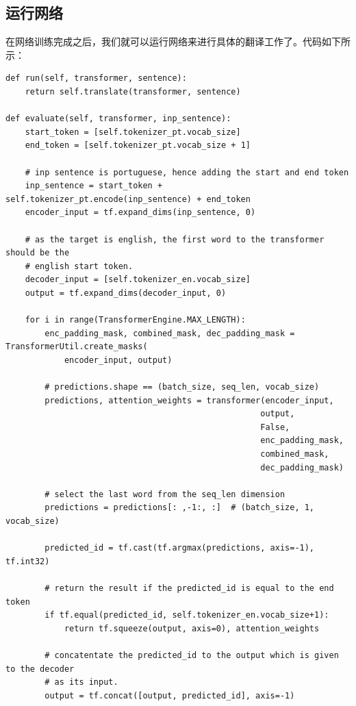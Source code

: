 \documentclass{article}
\begin{document}
\subsection{运行网络}
在网络训练完成之后，我们就可以运行网络来进行具体的翻译工作了。代码如下所示：
\begin{lstlisting}
def run(self, transformer, sentence):
    return self.translate(transformer, sentence)

def evaluate(self, transformer, inp_sentence):
    start_token = [self.tokenizer_pt.vocab_size]
    end_token = [self.tokenizer_pt.vocab_size + 1]
    
    # inp sentence is portuguese, hence adding the start and end token
    inp_sentence = start_token + self.tokenizer_pt.encode(inp_sentence) + end_token
    encoder_input = tf.expand_dims(inp_sentence, 0)
    
    # as the target is english, the first word to the transformer should be the
    # english start token.
    decoder_input = [self.tokenizer_en.vocab_size]
    output = tf.expand_dims(decoder_input, 0)
        
    for i in range(TransformerEngine.MAX_LENGTH):
        enc_padding_mask, combined_mask, dec_padding_mask = TransformerUtil.create_masks(
            encoder_input, output)
    
        # predictions.shape == (batch_size, seq_len, vocab_size)
        predictions, attention_weights = transformer(encoder_input, 
                                                    output,
                                                    False,
                                                    enc_padding_mask,
                                                    combined_mask,
                                                    dec_padding_mask)
        
        # select the last word from the seq_len dimension
        predictions = predictions[: ,-1:, :]  # (batch_size, 1, vocab_size)

        predicted_id = tf.cast(tf.argmax(predictions, axis=-1), tf.int32)
        
        # return the result if the predicted_id is equal to the end token
        if tf.equal(predicted_id, self.tokenizer_en.vocab_size+1):
            return tf.squeeze(output, axis=0), attention_weights
        
        # concatentate the predicted_id to the output which is given to the decoder
        # as its input.
        output = tf.concat([output, predicted_id], axis=-1)


\end{lstlisting}
\end{document}
